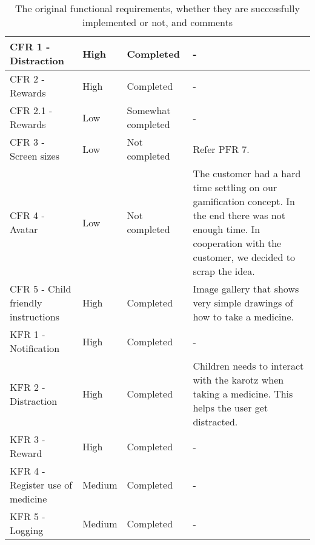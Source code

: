 \begin{table}
\begin{sideways}
\begin{tabular}{|p{5.0cm} | l | l | p{9.5cm} |}
\hline
\hline
CFR 1 - Distraction & High & Completed & - \\
\hline
CFR 2 - Rewards & High & Completed & - \\
\hline
CFR 2.1 - Rewards & Low & Somewhat completed & - \\
\hline
CFR 3 - Screen sizes & Low & Not completed & Refer PFR 7. \\
\hline 
CFR 4 - Avatar & Low & Not completed & The customer had a hard time settling on our gamification concept. In the end there was not enough time. In cooperation with the customer, we decided to scrap the idea. \\
\hline 
CFR 5 - Child friendly instructions & High & Completed & Image gallery that shows very simple drawings of how to take a medicine. \\
\hline
\hline
KFR 1 - Notification & High & Completed & - \\
\hline
KFR 2 - Distraction & High & Completed & Children needs to interact with the karotz when taking a medicine. This helps the user get distracted. \\
\hline 
KFR 3 - Reward & High &  Completed & - \\
\hline
KFR 4 - Register use of medicine & Medium & Completed & - \\
\hline 
KFR 5 - Logging & Medium & Completed & - \\
\hline
\end{tabular}
\end{sideways}
\label{tab:functionalrequirementscompleted}
\caption[Functional requirements completion]{The original functional requirements, whether they are successfully implemented or not, and comments}
\end{table}